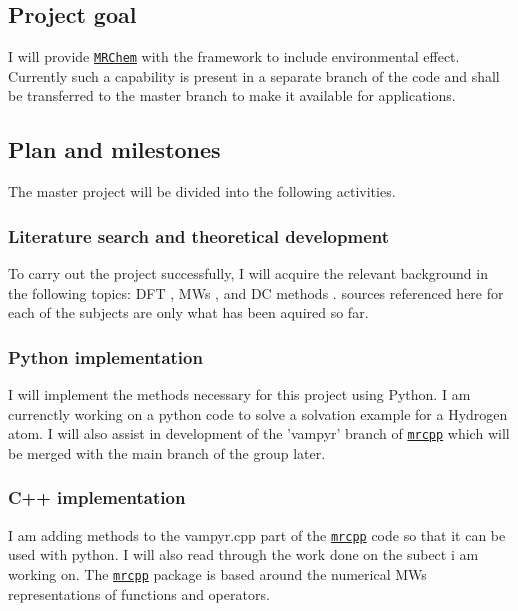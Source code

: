 \documentclass[a4paper,11pt]{article}
\newcommand{\mrchem}{\href{https://mrchem.readthedocs.io/en/latest/}{\texttt{MRChem}}}
\newcommand{\mrcpp}{\href{https://mrcpp.readthedocs.io/en/latest/}{\texttt{mrcpp}}}
\begin{document}
\subsection{Project goal}

I will provide \mrchem{} with the
framework to include environmental effect. Currently such a capability
is present in a separate branch of the code and shall be transferred
to the master branch to make it available for applications.

\subsection{Plan and milestones}

The master project will be divided into the following activities.

\subsubsection{Literature search and theoretical development}

To carry out the project successfully, I will acquire the relevant
background in the following topics: \acl{DFT} \cite{Jensen:2017}, \aclp{MW}
\cite{Frediani:2013, FossoTande:2013ka, Beylkin1999AdaptiveSO} ,
and \acl{DC} methods \cite{FossoTande:2013ka, Lipparini:2010bg}.
sources referenced here for each of the subjects are only what has been aquired so far.

\subsubsection{Python implementation}

I will implement the methods necessary for this project using Python.
I am currenctly working on a python code to solve a solvation example
for a Hydrogen atom. I will also assist in development of the 'vampyr'
branch of \mrcpp{} which will be merged with the main branch of the group
later.

\subsubsection{C++ implementation}
I am adding methods to the vampyr.cpp part of the \mrcpp{} code so
that it can be used with python. I will also read through the work
done on the subect i am working on. The \mrcpp{} package is based
around the numerical \aclp{MW} representations of functions and
operators.
\end{document}
